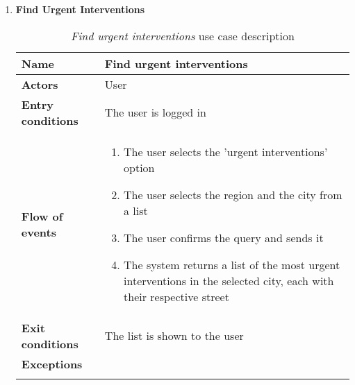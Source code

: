 \begin{enumerate}
			\item \textbf{Find Urgent Interventions}
				\begin{longtable}{p{0.25\linewidth}p{0.75\linewidth}}
					\toprule
					\textbf{Name} & \textbf{Find urgent interventions} \\
					\midrule
					\textbf{Actors} & User \\
					\midrule
					\textbf{Entry conditions} & The user is logged in \\
					\midrule
					\textbf{Flow of events} & 
					\begin{enumerate}
						\item The user selects the 'urgent interventions' option
						\item The user selects the region and the city from a list
						\item The user confirms the query and sends it
						\item The system returns a list of the most urgent interventions in the selected city, each with their respective street
					\end{enumerate} \\
					\midrule
					\textbf{Exit conditions} & The list is shown to the user\\
					\midrule
					\textbf{Exceptions} &  \\
					\bottomrule
					\caption{\emph{Find urgent interventions} use case description}
				\end{longtable}
			

\end{enumerate}
